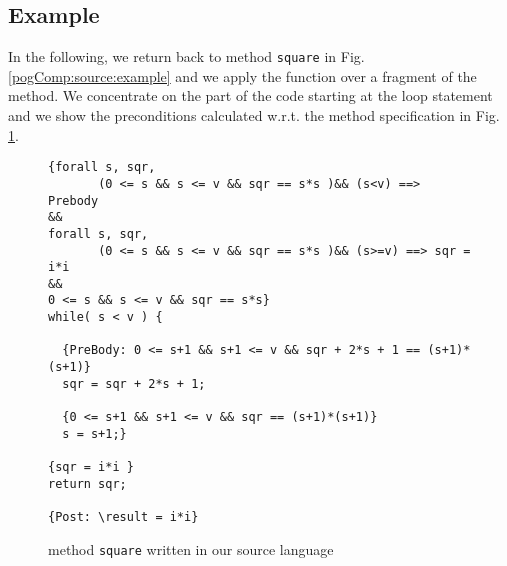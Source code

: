 \subsection{Example}\label{pogCompile:wpSrc:example}

In the following, we return back to method \lstinline!square! 
in Fig. \ref{pogComp:source:example} and we apply the \wpName{} function over a fragment of 
the  method. We concentrate on the part of the  code starting at the loop statement and we show the preconditions calculated  w.r.t. 
the method specification in Fig. \ref{pogComp:wpSource:example}.
 
 


\begin{figure}[ht!]
{\scriptsize
 \begin{lstlisting}[frame=trbl] 
{forall s, sqr,
       (0 <= s && s <= v && sqr == s*s )&& (s<v) ==> Prebody
&& 
forall s, sqr,
       (0 <= s && s <= v && sqr == s*s )&& (s>=v) ==> sqr = i*i
&&
0 <= s && s <= v && sqr == s*s}
while( s < v ) {

  {PreBody: 0 <= s+1 && s+1 <= v && sqr + 2*s + 1 == (s+1)*(s+1)}
  sqr = sqr + 2*s + 1;

  {0 <= s+1 && s+1 <= v && sqr == (s+1)*(s+1)}   
  s = s+1;}

{sqr = i*i }
return sqr;

{Post: \result = i*i}    
\end{lstlisting}
}
\caption{\sc method  \lstinline!square! written in our source language}
\label{pogComp:wpSource:example}

\end{figure}
